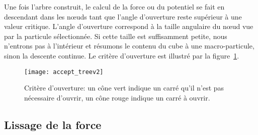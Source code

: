 			Une fois l'arbre construit, le calcul de la force ou du potentiel se fait en descendant dans les nœuds tant que l'angle
			d'ouverture reste supérieur à une valeur critique.
			L'angle d'ouverture correspond à la taille angulaire du nœud vue par la particule sélectionnée. Si cette taille est
			suffisamment petite, nous n'entrons pas à l'intérieur et résumons le contenu du cube à une macro-particule, sinon la descente
			continue. Le critère d'ouverture est illustré par la figure~\ref{Fig::KDTree::Parcours}.

			\begin{figure}
				\begin{center}
					\texttt{[image: accept\_treev2]}
					\caption{\label{Fig::KDTree::Parcours}
						Critère d'ouverture: un cône vert indique un carré qu'il n'est pas nécessaire d'ouvrir, un cône rouge
					indique un carré à ouvrir.}
				\end{center}
			\end{figure}

		\subsection{Lissage de la force}


